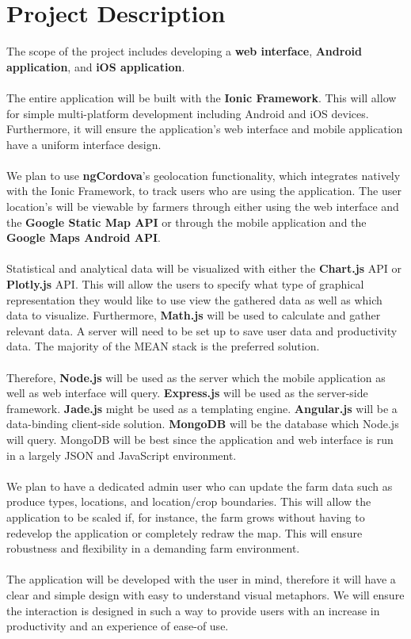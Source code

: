 \documentclass[12pt,a4paper]{article}
\begin{document}
   \section{Project Description}
The scope of the project includes developing a \textbf{web interface}, \textbf{Android application}, and \textbf{iOS application}.\\\\
The entire application will be built with the \textbf{Ionic Framework}. This will allow for simple multi-platform development including Android and iOS devices. Furthermore, it will ensure the application’s web interface and mobile application have a uniform interface design.\\\\
We plan to use \textbf{ngCordova}’s geolocation functionality, which integrates natively with the Ionic Framework, to track users who are using the application. The user location’s will be viewable by farmers through either using the web interface and the \textbf{Google Static Map API} or through the mobile application and the \textbf{Google Maps Android API}. \\\\
Statistical and analytical data will be visualized with either the \textbf{Chart.js} API or \textbf{Plotly.js} API. This will allow the users to specify what type of graphical representation they would like to use view the gathered data as well as which data to visualize. Furthermore, \textbf{Math.js} will be used to calculate and gather relevant data. 
A server will need to be set up to save user data and productivity data. The majority of the MEAN stack is the preferred solution. \\\\
Therefore, \textbf{Node.js} will be used as the server which the mobile application as well as web interface will query. \textbf{Express.js} will be used as the server-side framework. \textbf{Jade.js} might be used as a templating engine. \textbf{Angular.js} will be a data-binding client-side solution. \textbf{MongoDB} will be the database which Node.js will query. MongoDB will be best since the application and web interface is run in a largely JSON and JavaScript environment.\\\\
We plan to have a dedicated admin user who can update the farm data such as produce types, locations, and location/crop boundaries. This will allow the application to be scaled if, for instance, the farm grows without having to redevelop the application or completely redraw the map. This will ensure robustness and flexibility in a demanding farm environment.\\\\
The application will be developed with the user in mind, therefore it will have a clear and simple design with easy to understand visual metaphors. We will ensure the interaction is designed in such a way to provide users with an increase in productivity and an experience of ease-of use.   
\end{document}
